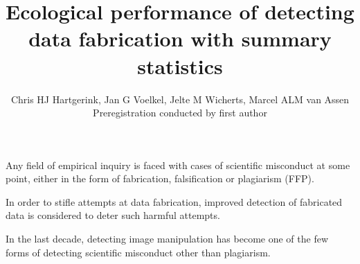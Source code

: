 \documentclass{article}
\title{Ecological performance of detecting data fabrication with summary statistics}
\author{Chris HJ Hartgerink, Jan G Voelkel, Jelte M Wicherts, Marcel ALM van Assen\\
Preregistration conducted by first author}
\begin{document}

\maketitle

Any field of empirical inquiry is faced with cases of scientific misconduct at some point, either in the form of fabrication, falsification or plagiarism (FFP). 

In order to stifle attempts at data fabrication, improved detection of fabricated data is considered to deter such harmful attempts. 

In the last decade, detecting image manipulation has become one of the few forms of detecting scientific misconduct other than plagiarism.
\end{document}
